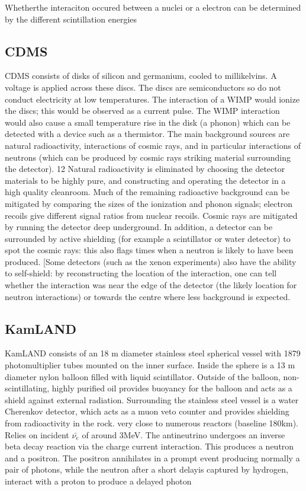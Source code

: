 \documentclass[]{article}
\begin{document}
	Whetherthe interaciton occured between a nuclei or a electron can be determined by the different scintillation energies 
	
	\subsection{CDMS}
	
	CDMS consists of disks of silicon and germanium, cooled to millikelvins. A
	voltage is applied across these discs. The discs are semiconductors so do not
	conduct electricity at low temperatures. The interaction of a WIMP would
	ionize the discs; this would be observed as a current pulse. The WIMP
	interaction would also cause a small temperature rise in the disk (a phonon)
	which can be detected with a device such as a thermistor.
	The main background sources are natural radioactivity, interactions of
	cosmic rays, and in particular interactions of neutrons (which can be produced
	by cosmic rays striking material surrounding the detector).
	12
	Natural radioactivity is eliminated by choosing the detector materials to
	be highly pure, and constructing and operating the detector in a high quality
	cleanroom. Much of the remaining radioactive background can be mitigated
	by comparing the sizes of the ionization and phonon signals; electron recoils
	give different signal ratios from nuclear recoils.
	Cosmic rays are mitigated by running the detector deep underground. In
	addition, a detector can be surrounded by active shielding (for example a
	scintillator or water detector) to spot the cosmic rays: this also flags times
	when a neutron is likely to have been produced. [Some detectors (such as the
	xenon experiments) also have the ability to self-shield: by reconstructing the
	location of the interaction, one can tell whether the interaction was near the
	edge of the detector (the likely location for neutron interactions) or towards
	the centre where less background is expected.
	
	\subsection{KamLAND}
	
	KamLAND consists of an 18 m diameter stainless steel spherical vessel with 1879 photomultiplier tubes mounted on the inner surface. Inside the sphere is a 13 m diameter nylon balloon filled with liquid scintillator. Outside of the balloon, non-scintillating, highly purified oil provides buoyancy for the balloon and acts as a shield against external radiation. Surrounding the stainless steel vessel is a water Cherenkov detector, which acts as a muon veto counter and provides shielding from radioactivity in the rock. very close to numerous reactors (baseline 180km). Relies on incident $\bar{\nu_e}$ of around 3MeV. The antineutrino undergoes an inverse beta decay reaction via the charge current interaction. This produces a neutron and a positron. The positron annihilates in a prompt event producing normally a pair of photons, while the neutron  after a short delayis captured by hydrogen, interact with a proton to produce a delayed photon
\end{document}
